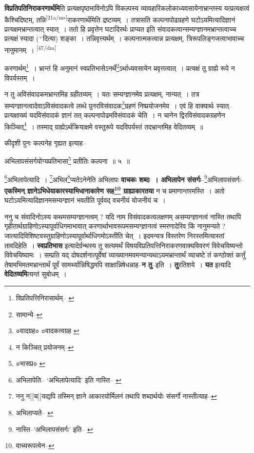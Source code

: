 \documentclass[article,12pt,a4paper]{memoir}
\newcommand{\add}[1]{($^{+}$#1)}
\begin{document}
	  \pstart \textbf{विप्रतिपतिनिराकरणार्थमि}ति प्रत्यक्षपृष्ठभाविनोऽपि विकल्पस्य व्यावहारिकलोकाध्यवसायेनाभ्रान्तस्य यत्प्रत्यक्षत्वं कैश्चिदिष्टम्, तन्नि\leavevmode\textsuperscript{\rmlatinfont\tiny [21a/ms]}राकरणार्थमिति द्रष्टव्यम् । तत्रासति कल्पनापोढग्रहणे घटोऽयमित्यादिज्ञानं प्रत्यक्षमभ्रान्तत्वात् स्यात् । ततो हि प्रवृत्तेन घटादिरर्थः प्राप्यत इति संवादकत्वान्सम्यग्ज्ञानमभ्रान्तत्वाच्च प्रत्यक्षं स्यादा \add{दित्या} शङ्का । तन्निवृत्त्यर्थम् । कल्पनात्मकत्वान्न प्रत्यक्षम्, त्रिरूपलिङ्गजत्वाभावाच्च नानुमानम् ।  \leavevmode\textsuperscript{\rmlatinfont\tiny [47/dm]} 
	  
	करणार्थम्\footnote{विप्रतिपत्तिनिरासार्थम्--\cite{dp-msB} \cite{dp-msC} \cite{dp-msD} \cite{dp-edN}} । भ्रान्तं हि अनुमानं स्वप्रतिभासेऽनर्थे\footnote{सामान्ये--\cite{dp-msD-n}}ऽर्थाध्यवसायेन प्रवृत्तत्वात् । प्रत्यक्षं तु ग्राह्ये रूपे न विपर्यस्तम् । 
	  
	न तु अविसंवादकमभ्रान्तमिह ग्रहीतव्यम् । यतः सम्यग्ज्ञानमेव प्रत्यक्षम्, नान्यत् । तत्र सम्यग्ज्ञानत्वादेवाऽविसंवादकत्वे लब्धे पुनरविसंवादक\footnote{०वादग्रह० \cite{dp-edE} ०वादकत्वग्रह \cite{dp-msC}}ग्रहणं निष्प्रयोजनमेव । एवं हि वाक्यार्थः स्यात्--प्रत्यक्षाख्यं यदविसंवादकं ज्ञानं तत् कल्पनापोढमविसंवादकं चेति । न चानेन द्विरविसंवादकग्रहणेन किञ्चित्\footnote{न किञ्चित् प्रयोजनम्--\cite{dp-msD-n}} । तस्माद् ग्राह्येऽर्थक्रियाक्षमे वस्तुरूपे यदविपर्यस्तं तदभ्रान्तमिह वेदितव्यम् ॥ 
	  
	कीदृशी पुनः कल्पनेह गृह्यत इत्याह-- 
	  
	अभिलापसंसर्गयोग्यप्रतिभासा\footnote{०भासप्र० \cite{dp-msB} \cite{dp-edP} \cite{dp-edE} \cite{dp-edH} \cite{dp-edN}} प्रतीतिः कल्पना ॥ ५ ॥ 
	  
	\footnote{अभिलापेति--\cite{dp-edE} \cite{dp-edP} ‘अभिलापेत्यादि’ इति नास्ति--\cite{dp-msA} \cite{dp-msB} \cite{dp-edH} \cite{dp-edN}}अभिलापेत्यादि । \footnote{ननु न[[च]]यद्यपि तस्मिन् ज्ञाने आकारयोर्मिलनं तथापि शब्दार्थयोः संसर्गो नास्तीत्याह--\cite{dp-msD-n}}अभिल\footnote{अभिलाप्यते--\cite{dp-msA} \cite{dp-edP} \cite{dp-edH} \cite{dp-edE}}प्यतेऽनेनेति अभिलापः \textbf{वाचकः शब्दः । अभिलापेन संसर्गः}--\footnote{नास्ति--‘अभिलापसंसर्गः’ इति--\cite{dp-msA} \cite{dp-edP} \cite{dp-edE}}अभिलापसंसर्गः--\textbf{एकस्मिन् ज्ञानेऽभिधेयाकारस्याभिधानाकारेण सह\footnote{वाच्यरूपत्वेन--\cite{dp-msD-n}} ग्राह्याकारतया} न च प्रमाणान्तरमस्ति । अतो घटोऽयमित्यादिज्ञानमसम्यग्ज्ञानं भवतीति पूर्ववद् वचनीयं योजनीयं च ।
	\pend
      

	  \pstart ननु च संवादिनोऽस्य कथमसम्यग्ज्ञानत्वम् ? यदि नाम विसंवादकत्वलक्षणम् असम्यग्ज्ञानत्वं नास्ति तथापि गृहीतार्थग्राहिणोऽस्यापूर्वाधिगमाभावात् करणार्थाभावरूपमसम्यग्ज्ञानत्वं स्मरणादेरिव किं नानुमन्यते ? जात्यादिविशिष्टवस्तुग्राहिणोऽस्यापूर्वार्थाधिगमोऽस्तीति चेत् । इदमन्यत्र विस्तरेण निरस्तमित्यास्तां तावदिहेति । \textbf{स्वप्रतिभास} इत्यादेर्ग्रन्थस्य तु सत्यमर्थं विषयविप्रतिपत्तिनिराकरणवाक्यविवरणं विवेचयिष्यन्तो विवेचयिष्यामः । सम्प्रति यद् दोषदर्शनात्पूर्वेषां व्याख्यानमवमन्यान्यथाऽयमभ्रान्तार्थं व्याचष्टे तं कण्ठोक्तं कर्त्तुं तेषामभिमतमभ्रान्तार्थं पूर्वं सामर्थ्यान्निषिद्धमपि साक्षान्निषेधन्नाह--\textbf{न तु}--इति । \textbf{तु}रतिशये । \textbf{यत} इत्यादि \textbf{वेदितव्यमि}त्यन्तं सुबोधम् ।
	\pend
      
\end{document}
